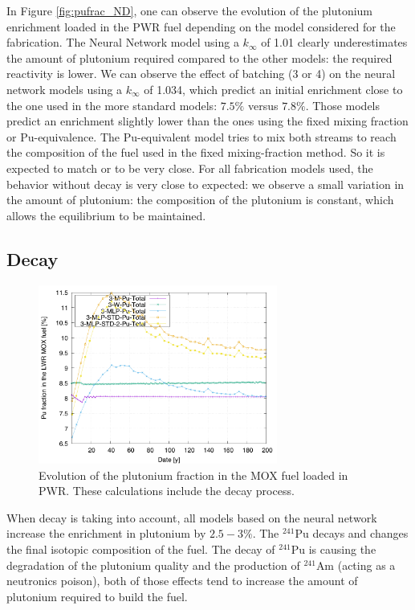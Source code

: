 \documentclass[12pt]{article}
\begin{document}
In Figure \ref{fig:pufrac_ND}, one can observe the evolution of the plutonium
enrichment loaded in the PWR fuel depending on the model considered for the
fabrication.
The Neural Network model using a $k_{\infty}$ of 1.01 clearly underestimates the amount of
plutonium required compared to the other models: the required reactivity is
lower. We can observe the effect of batching (3 or 4) on the
neural network models using a $k_{\infty}$ of 1.034, which predict an initial enrichment
close to the one used in the more standard models: $7.5\%$ versus $7.8\%$. Those
models predict an enrichment slightly lower than the ones using the fixed mixing
fraction or Pu-equivalence.
The Pu-equivalent model tries to mix both streams to reach the composition of the fuel
used in the fixed mixing-fraction method. So it is expected to match or to be very
close.
For all fabrication models used, the behavior without decay is very close to
expected: we observe a small variation in the amount of plutonium: the
composition of the plutonium is constant, which allows the equilibrium to be
maintained. 


\subsection{Decay}

\begin{figure}[h!]
  \centering
  \includegraphics[width=0.7\textwidth]  {img/C_1_3_MOX_pu_contribution}
  \caption{Evolution of the plutonium fraction in the MOX fuel loaded in PWR.
  These calculations include the decay process.}
  \label{fig:puflow_D}
\end{figure}

When decay is taking into account, all models based on the neural network
increase the enrichment in plutonium by $2.5-3\%$. The $^{241}$Pu decays and
changes the final isotopic composition of the fuel.  The decay of $^{241}$Pu is
causing the degradation of the plutonium quality and the production of
$^{241}$Am (acting as a neutronics poison), both of those effects tend to
increase the amount of plutonium required to build the fuel.
\end{document}
